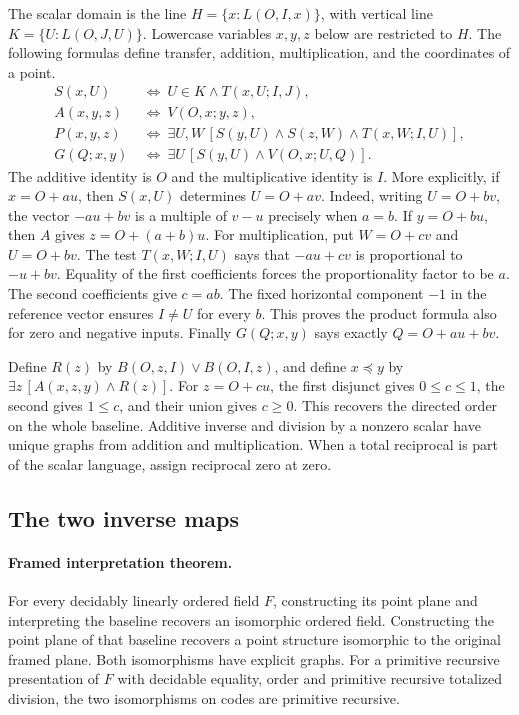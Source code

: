The scalar domain is the line $H=\{x:L(O,I,x)\}$, with vertical line
$K=\{U:L(O,J,U)\}$. Lowercase variables $x,y,z$ below are restricted
to $H$. The following formulas define transfer, addition, multiplication,
and the coordinates of a point.
\begin{align*}
 S(x,U)&\ \Longleftrightarrow\ U\in K\land T(x,U;I,J),\\
 A(x,y,z)&\ \Longleftrightarrow\ V(O,x;y,z),\\
 P(x,y,z)&\ \Longleftrightarrow\
   \exists U,W\,[S(y,U)\land S(z,W)\land T(x,W;I,U)],\\
 G(Q;x,y)&\ \Longleftrightarrow\
   \exists U\,[S(y,U)\land V(O,x;U,Q)].
\end{align*}
The additive identity is $O$ and the multiplicative identity is $I$. More explicitly, if $x=O+a u$, then
$S(x,U)$ determines $U=O+a v$. Indeed, writing $U=O+bv$, the vector
$-a u+bv$ is a multiple of $v-u$ precisely when $a=b$.
If $y=O+b u$, then $A$ gives $z=O+(a+b)u$. For multiplication, put
$W=O+c v$ and $U=O+bv$. The test
$T(x,W;I,U)$ says that $-a u+c v$ is proportional to $-u+bv$.
Equality of the first coefficients forces the proportionality factor
to be $a$. The second coefficients give $c=ab$. The fixed horizontal
component $-1$ in the reference vector ensures $I\ne U$ for
every $b$. This proves the product formula also for zero and negative
inputs. Finally $G(Q;x,y)$ says exactly $Q=O+a u+b v$.



Define $R(z)$ by $B(O,z,I)\lor B(O,I,z)$, and define
$x\preceq y$ by $\exists z\,[A(x,z,y)\land R(z)]$. For
$z=O+c u$, the first disjunct gives $0\le c\le1$, the second gives
$1\le c$, and their union gives $c\ge0$. This recovers the directed
order on the whole baseline. Additive inverse and division by a nonzero
scalar have unique graphs from addition and multiplication. When a total
reciprocal is part of the scalar language, assign reciprocal zero at zero.

\subsection{The two inverse maps}

\paragraph{Framed interpretation theorem.}
For every decidably linearly ordered field $F$, constructing its
point plane and interpreting the baseline recovers an isomorphic ordered
field. Constructing the point plane of that baseline recovers a point
structure isomorphic to the original framed plane. Both isomorphisms
have explicit graphs. For a primitive recursive presentation of $F$
with decidable equality, order and primitive recursive totalized
division, the two isomorphisms on codes are primitive recursive.

